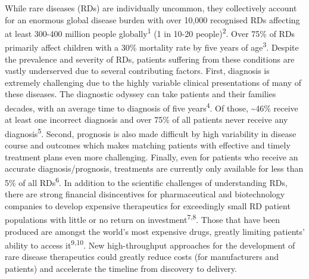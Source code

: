 \documentclass[
]{article}
\begin{document}
While rare diseases (RDs) are individually uncommon, they collectively
account for an enormous global disease burden with over 10,000
recognised RDs affecting at least 300-400 million people
globally\textsuperscript{1} (1 in 10-20 people)\textsuperscript{2}. Over
75\% of RDs primarily affect children with a 30\% mortality rate by five
years of age\textsuperscript{3}. Despite the prevalence and severity of
RDs, patients suffering from these conditions are vastly underserved due
to several contributing factors. First, diagnosis is extremely
challenging due to the highly variable clinical presentations of many of
these diseases. The diagnostic odyssey can take patients and their
families decades, with an average time to diagnosis of five
years\textsuperscript{4}. Of those, \textasciitilde46\% receive at least
one incorrect diagnosis and over 75\% of all patients never receive any
diagnosis\textsuperscript{5}. Second, prognosis is also made difficult
by high variability in disease course and outcomes which makes matching
patients with effective and timely treatment plans even more
challenging. Finally, even for patients who receive an accurate
diagnosis/prognosis, treatments are currently only available for less
than 5\% of all RDs\textsuperscript{6}. In addition to the scientific
challenges of understanding RDs, there are strong financial
disincentives for pharmaceutical and biotechnology companies to develop
expensive therapeutics for exceedingly small RD patient populations with
little or no return on investment\textsuperscript{7,8}. Those that have
been produced are amongst the world's most expensive drugs, greatly
limiting patients' ability to access it\textsuperscript{9,10}. New
high-throughput approaches for the development of rare disease
therapeutics could greatly reduce costs (for manufacturers and patients)
and accelerate the timeline from discovery to delivery.
\end{document}
